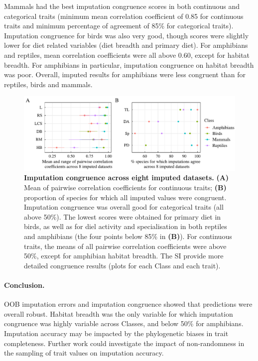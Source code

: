 Mammals had the best imputation congruence scores in both continuous and categorical traits (minimum mean correlation coefficient of 0.85 for continuous traits and minimum percentage of agreement of 85\% for categorical traits). Imputation congruence for birds was also very good, though scores were slightly lower for diet related variables (diet breadth and primary diet). For amphibians and reptiles, mean correlation coefficients were all above 0.60, except for habitat breadth. For amphibians in particular, imputation congruence on habitat breadth was poor. Overall, imputed results for amphibians were less congruent than for reptiles, birds and mammals.

\begin{figure}[h!]
\centering
\includegraphics[scale=0.75]{figures/chapter2/Congruence_imputations/Summary}
\caption[Imputation congruence across eight imputed datasets]{\textbf{Imputation congruence across eight imputed datasets.} \textbf{(A)} Mean of pairwise correlation coefficients for continuous traits; \textbf{(B)} proportion of species for which all imputed values were congruent. Imputation congruence was overall good for categorical traits (all above 50\%). The lowest scores were obtained for primary diet in birds, as well as for diel activity and specialisation in both reptiles and amphibians (the four points below 85\% in \textbf{(B)}). For continuous traits, the means of all pairwise correlation coefficients were above 50\%, except for amphibian habitat breadth. The SI provide more detailed congruence results (plots for each Class and each trait).}
\label{congruence}
\end{figure}

\paragraph{Conclusion.} OOB imputation errors and imputation congruence showed that predictions were overall robust. Habitat breadth was the only variable for which imputation congruence was highly variable across Classes, and below 50\% for amphibians. Imputation accuracy may be impacted by the phylogenetic biases in trait completeness. Further work could investigate the impact of non-randomness in the sampling of trait values on imputation accuracy. 

